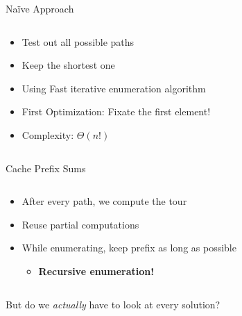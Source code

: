 
\begin{frame}{Na\"ive Approach}
  \begin{columns}
    \begin{column}{0.5\textwidth}
      \begin{itemize}
        \item Test out all possible paths
        \item Keep the shortest one
        \item Using Fast iterative enumeration algorithm \cite{nayuki_next_nodate}
        \item First Optimization: Fixate the first element!
        \item Complexity: $\Theta(n!)$
      \end{itemize}
    \end{column}
    \pause
    \begin{column}{0.5\textwidth}
      \begin{figure}
      \footnotesize\inputminted[xleftmargin=1em,fontsize=\tiny,linenos]{rust}{./assets/02_first_impl.rs}
      \end{figure}
    \end{column}
  \end{columns}
\end{frame}

\begin{frame}{Cache Prefix Sums}
  \begin{columns}
    \begin{column}{0.5\textwidth}
      \begin{itemize}
        \item After every path, we compute the tour
        \item Reuse partial computations
        \item While enumerating, keep prefix as long as possible
          \begin{itemize}
            \item \textbf{Recursive enumeration!}
          \end{itemize}
      \end{itemize}
    \end{column}
    \pause
    \begin{column}{0.5\textwidth}
      \begin{figure}
      \footnotesize\inputminted[xleftmargin=1em,fontsize=\small,linenos]{python}{./assets/02_recenum.py}
      \end{figure}
    \end{column}
  \end{columns}
  \pause
  \begin{center}
    {\Large But do we \textit{actually} have to look at every solution?}
  \end{center}
\end{frame}

